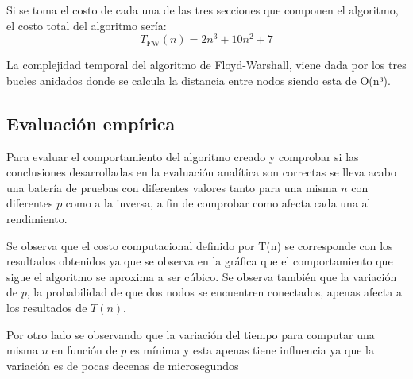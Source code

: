 Si se toma el costo de cada una de las tres secciones que componen el algoritmo, el costo total del algoritmo sería:
\begin{equation}
    T_{\mathrm{FW}}(n) = 2n^3 + 10n^2 + 7
\end{equation}

La complejidad temporal del algoritmo de Floyd-Warshall, viene dada por los tres bucles anidados donde se calcula la distancia entre nodos  siendo esta de O(n³).

\subsection*{Evaluación empírica}

Para evaluar el comportamiento del algoritmo creado y comprobar si las conclusiones desarrolladas en la evaluación analítica son correctas se lleva acabo una batería de pruebas con diferentes valores tanto para una misma $n$ con diferentes $p$ como a la inversa, a fin de comprobar como afecta cada una al rendimiento.


Se observa que el costo computacional definido por T(n) se corresponde con los resultados obtenidos ya que se observa en la gráfica que el comportamiento que sigue el algoritmo se aproxima a ser cúbico. Se observa también que la variación de $p$, la probabilidad de que dos nodos se encuentren conectados, apenas  afecta a los resultados de $T(n)$.

Por otro lado se observando que la variación del tiempo para computar una misma $n$ en función de $p$ es mínima y esta apenas tiene influencia ya que la variación es de pocas decenas de microsegundos
